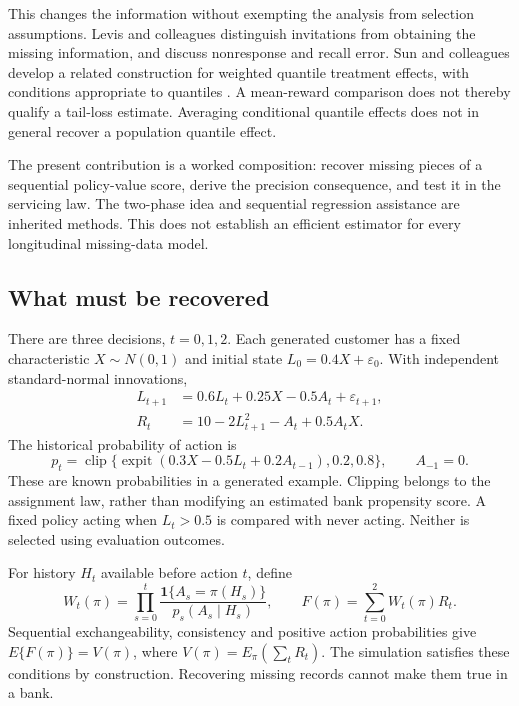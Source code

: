 This changes the information without exempting the analysis from selection
assumptions. Levis and colleagues distinguish invitations from obtaining the
missing information, and discuss nonresponse and recall error. Sun and
colleagues develop a related construction for weighted quantile treatment
effects, with conditions appropriate to quantiles \citep{sun2025double}.
A mean-reward comparison does not thereby qualify a tail-loss estimate.
Averaging conditional quantile effects does not in general recover a
population quantile effect.

The present contribution is a worked composition: recover missing pieces of
a sequential policy-value score, derive the precision consequence, and test
it in the servicing law. The two-phase idea and sequential regression
assistance are inherited methods. This does not establish an efficient
estimator for every longitudinal missing-data model.

\subsection{What must be recovered}
There are three decisions, $t=0,1,2$. Each generated customer has a fixed
characteristic $X\sim N(0,1)$ and initial state
$L_0=0.4X+\varepsilon_0$. With independent standard-normal innovations,
\begin{align*}
L_{t+1}&=0.6L_t+0.25X-0.5A_t+\varepsilon_{t+1},\\
R_t&=10-2L_{t+1}^{2}-A_t+0.5A_tX.
\end{align*}
The historical probability of action is
\[
p_t=\operatorname{clip}\{\operatorname{expit}(0.3X-0.5L_t+0.2A_{t-1}),
                       0.2,0.8\},\qquad A_{-1}=0.
\]
These are known probabilities in a generated example. Clipping belongs to
the assignment law, rather than modifying an estimated bank propensity
score. A fixed policy acting when $L_t>0.5$ is compared with never acting.
Neither is selected using evaluation outcomes.

For history $H_t$ available before action $t$, define
\[
W_t(\pi)=\prod_{s=0}^{t}
 \frac{\mathbf1\{A_s=\pi(H_s)\}}{p_s(A_s\mid H_s)},
\qquad F(\pi)=\sum_{t=0}^{2}W_t(\pi)R_t.
\]
Sequential exchangeability, consistency and positive action probabilities
give $E\{F(\pi)\}=V(\pi)$, where
$V(\pi)=E_\pi(\sum_t R_t)$. The simulation satisfies these conditions by
construction. Recovering missing records cannot make them true in a bank.

